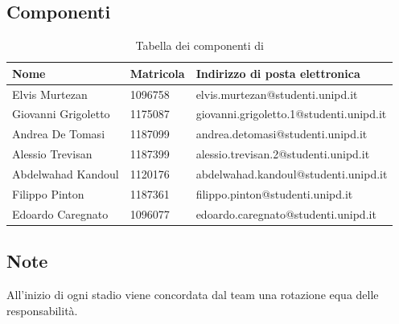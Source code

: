 \subsection{Componenti}
{
    \renewcommand{\arraystretch}{2}
	\begin{longtable}{ C{4cm} C{2cm} C{8cm} }
		\caption{Tabella dei componenti di \Gruppo{}}\\
		\rowcolor{\primaryColor}
        \textcolor{\secondaryColor}{\textbf{Nome}} & \textcolor{\secondaryColor}{\textbf{Matricola}} & \textcolor{\secondaryColor}{\textbf{Indirizzo di posta elettronica}}\\\endhead	
        {Elvis Murtezan} & 1096758 & {elvis.murtezan@studenti.unipd.it}\\   
        {Giovanni Grigoletto} & 1175087 & {giovanni.grigoletto.1@studenti.unipd.it}\\    
        {Andrea De Tomasi} & 1187099 & {andrea.detomasi@studenti.unipd.it}\\    
        {Alessio Trevisan} & 1187399 & {alessio.trevisan.2@studenti.unipd.it}\\    
        {Abdelwahad Kandoul} & 1120176 & {abdelwahad.kandoul@studenti.unipd.it} \\    
        {Filippo Pinton} & 1187361 & {filippo.pinton@studenti.unipd.it}\\    
        {Edoardo Caregnato} & 1096077 & {edoardo.caregnato@studenti.unipd.it}\\       
	\end{longtable}
}
\subsection{Note}
All'inizio di ogni stadio viene concordata dal team una rotazione equa delle responsabilità.